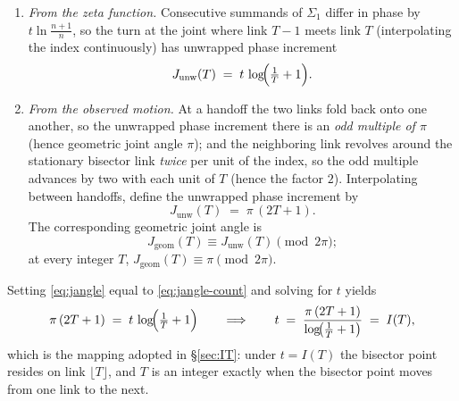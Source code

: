 \documentclass[11pt]{article}
\theoremstyle{definition}
\begin{document}
\begin{enumerate}
\item \emph{From the zeta function.} Consecutive summands of $\Sigma_1$ differ
in phase by $t\ln\frac{n+1}{n}$, so the turn at the joint where link $T-1$
meets link $T$ (interpolating the index continuously) has unwrapped phase
increment
\begin{equation}\label{eq:jangle}
J_{\mathrm{unw}}(T) \;=\; t\,\log\!\Bigl(\tfrac{1}{T}+1\Bigr).
\end{equation}
\item \emph{From the observed motion.} At a handoff the two links fold back
onto one another, so the unwrapped phase increment there is an
\emph{odd multiple of $\pi$} (hence geometric joint angle $\pi$); and the neighboring link revolves around the
stationary bisector link \emph{twice} per unit of the index, so the odd
multiple advances by two with each unit of $T$ (hence the factor $2$).
Interpolating between handoffs, define the unwrapped phase increment by
\begin{equation}\label{eq:jangle-count}
J_{\mathrm{unw}}(T) \;=\; \pi\,(2T+1).
\end{equation}
The corresponding geometric joint angle is
\[
J_{\mathrm{geom}}(T)\equiv J_{\mathrm{unw}}(T)\pmod{2\pi};
\]
at every integer $T$, $J_{\mathrm{geom}}(T)\equiv\pi\pmod{2\pi}$.
\end{enumerate}

Setting \eqref{eq:jangle} equal to \eqref{eq:jangle-count} and solving for $t$
yields
\begin{equation}\label{eq:IT-derived}
\pi\,(2T+1) \;=\; t\,\log\!\Bigl(\tfrac{1}{T}+1\Bigr)
\qquad\Longrightarrow\qquad
t \;=\; \frac{\pi\,(2T+1)}{\log\!\bigl(\tfrac{1}{T}+1\bigr)} \;=\; I(T),
\end{equation}
which is the mapping adopted in \S\ref{sec:IT}: under $t=I(T)$ the bisector
point resides on link $\lfloor T\rfloor$, and $T$ is an integer exactly when
the bisector point moves from one link to the next.
\end{document}
